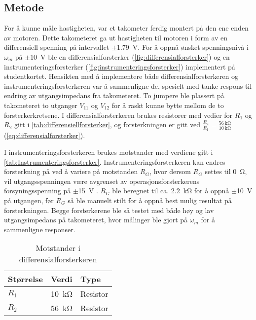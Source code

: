 \subsection{Metode}

For å kunne måle hastigheten, var et takometer ferdig montert på den ene enden av motoren. Dette takometeret ga ut hastigheten til motoren i form av en differensiell spenning på intervallet $\pm${\SI{1.79}{\volt}}. For å oppnå ønsket spenningsnivå i $\omega_m$ på $\pm${\SI{10}{\volt}} ble en differensialforsterker (\autoref{fig:differensialforsterker}) og en instrumenteringsforsterker (\autoref{fig:instrumenteringsforsterker}) implementert på studentkortet.
Hensikten med å implementere både differensialforsterkeren og instrumenteringsforsterkeren var å sammenligne de, spesielt med tanke respons til endring av utgangsimpedans fra takometeret.
To jumpere ble plassert på takometeret to utganger $V_{11}$ og $V_{12}$ for å raskt kunne bytte mellom de to forsterkerkretsene. I differensialforsterkeren brukes resistorer med vedier for $R_1$ og $R_2$ gitt i \autoref{tab:differensiellforsterker}, og forsterkningen er gitt ved $\frac{R_2}{R_1} = \frac{\SI{56}{\kilo\ohm}}{\SI{10}{\kilo\ohm}}$(\autoref{eq:differensialforsterker}).

I instrumenteringsforsterkeren brukes motstander med verdiene gitt i \autoref{tab:Instrumenteringsforsterker}. Instrumenteringsforsterkeren kan endres forsterkning på ved å variere på motstanden $R_G$, hvor dersom $R_G$ settes til {\SI{0}{\ohm}}, vil utgangsspenningen være avgrenset av operasjonsforsterkerens forsyningsspenning på $\pm${\SI{15}{\volt}} . $R_G$ ble beregnet til ca. {\SI{2.2}{\kilo\ohm}} for å oppnå $\pm${\SI{10}{\volt}} på utgangen, før $R_G$ så ble manuelt stilt for å oppnå best mulig resultat på forsterkningen. Begge forsterkerene ble så testet med både høy og lav utgangsimpedans på takometeret, hvor målinger ble gjort på $\omega_m$ for å sammenligne responser.

\begin{table}[h]
	\centering
    \caption{Motstander i differensialforsterkeren}
	\begin{tabular}{lll}
		\toprule
		Størrelse & Verdi & Type \\
		\midrule
        $R_1$ & \SI{10}{\kilo\ohm} & Resistor \\
        $R_2$ & \SI{56}{\kilo\ohm} & Resistor\\
		\bottomrule
	\end{tabular}
\label{tab:differensiellforsterker}
\end{table}

